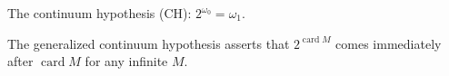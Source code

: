 The continuum hypothesis (CH): $2^{\omega_0} = \omega_1$.

The generalized continuum hypothesis asserts that $2^{\operatorname{card}M}$ comes immediately after $\operatorname{card} M$ for any infinite $M$.